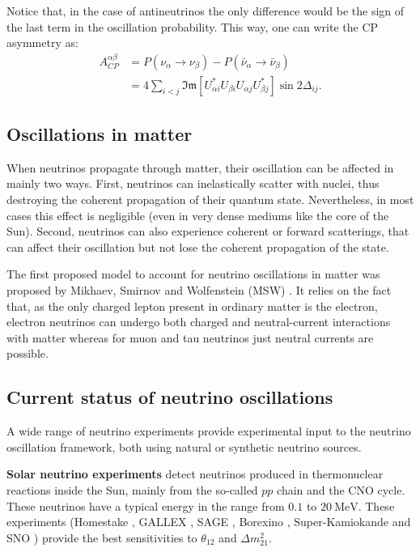 Notice that, in the case of antineutrinos the only difference would be the sign of the last term in the oscillation probability. This way, one can write the CP asymmetry as:
\begin{equation}\label{2.9}
\begin{split}
A^{\alpha\beta}_{CP}&=P(\nu_{\alpha} \rightarrow \nu_{\beta})-P(\bar{\nu}_{\alpha} \rightarrow \bar{\nu}_{\beta})\\
&=4  \sum_{i<j} \mathfrak{Im}\left[U^{*}_{\alpha i} U_{\beta i} U_{\alpha j} U^{*}_{\beta j}\right] \sin 2\Delta_{ij}.
\end{split}
\end{equation}

\subsection{Oscillations in matter}

When neutrinos propagate through matter, their oscillation can be affected in mainly two ways. First, neutrinos can inelastically scatter with nuclei, thus destroying the coherent propagation of their quantum state. Nevertheless, in most cases this effect is negligible (even in very dense mediums like the core of the Sun). Second, neutrinos can also experience coherent or forward scatterings, that can affect their oscillation but not lose the coherent propagation of the state.

The first proposed model to account for neutrino oscillations in matter was proposed by Mikhaev, Smirnov and Wolfenstein (MSW) \cite{Wolfenstein1977}. It relies on the fact that, as the only charged lepton present in ordinary matter is the electron, electron neutrinos can undergo both charged and neutral-current interactions with matter whereas for muon and tau neutrinos just neutral currents are possible.

\subsection{Current status of neutrino oscillations}

A wide range of neutrino experiments provide experimental input to the neutrino oscillation framework, both using natural or synthetic neutrino sources.

\textbf{Solar neutrino experiments} detect neutrinos produced in thermonuclear reactions inside the Sun, mainly from the so-called $pp$ chain and the CNO cycle. These neutrinos have a typical energy in the range from $0.1$ to $20 \ \mathrm{MeV}$. These experiments (Homestake \cite{Homestake1998}, GALLEX \cite{GALLEX2010}, SAGE \cite{SAGE2009}, Borexino \cite{Borexino2011}, Super-Kamiokande \cite{Super-Kamiokande2005} and SNO \cite{SNO2011}) provide the best sensitivities to $\theta_{12}$ and $\Delta m^{2}_{21}$.

